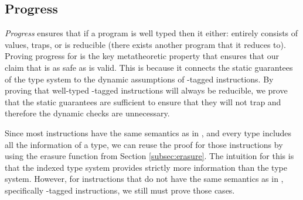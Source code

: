 \subsection{Progress}
\label{subsec:progress}
\emph{Progress} ensures that if a program is well typed then it either: entirely consists of values, traps, or is reducible (\ie there exists another program that it reduces to).
Proving progress for \name is the key metatheoretic property that ensures that our claim that \name is as safe as \wasm is valid.
This is because it connects the static guarantees of the type system to the dynamic assumptions of \prechk-tagged instructions.
By proving that well-typed \prechk-tagged instructions will always be reducible, we prove that the static guarantees are sufficient to ensure that they will not trap and therefore the dynamic checks are unnecessary.

Since most \name instructions have the same semantics as in \wasm, and every \name type includes all the information of a \wasm type, we can reuse the \wasm proof for those instructions by using the erasure function from Section \ref{subsec:erasure}.
The intuition for this is that the \name indexed type system provides strictly more information than the \wasm type system.
However, for \name instructions that do not have the same semantics as in \wasm, specifically \prechk-tagged instructions, we still must prove those cases.

